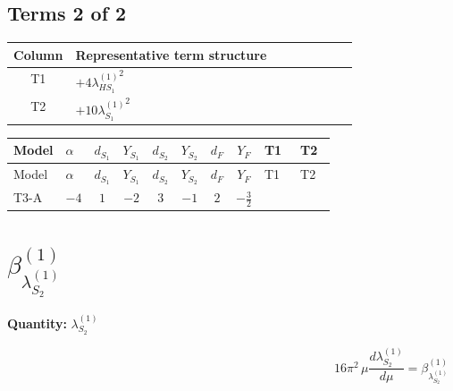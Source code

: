 \documentclass[8pt]{article}
\begin{document}
\begin{landscape}
\subsection*{Terms 2 of 2}
\begin{center}
\begin{tabular}{@{}c >{\raggedright\arraybackslash}p{0.82\linewidth}@{}}
\toprule
Column & Representative term structure \\
\midrule
T1 & \(\displaystyle +4 {\lambda_{HS_1}^{(1)}}^2\) \\
\midrule
T2 & \(\displaystyle +10 {\lambda_{S_1}^{(1)}}^2\) \\
\midrule
\bottomrule
\end{tabular}
\end{center}
\smallskip
\tiny
\begin{longtable}{@{}llcccccc >{\raggedright\arraybackslash}p{0.21\linewidth} >{\raggedright\arraybackslash}p{0.21\linewidth}@{}}
\toprule
Model & $\alpha$ & $d_{S_1}$ & $Y_{S_1}$ & $d_{S_2}$ & $Y_{S_2}$ & $d_F$ & $Y_F$ & T1 & T2 \\
\midrule
\endfirsthead
\toprule
Model & $\alpha$ & $d_{S_1}$ & $Y_{S_1}$ & $d_{S_2}$ & $Y_{S_2}$ & $d_F$ & $Y_F$ & T1 & T2 \\
\midrule
\endhead
T3-A & $-4$ & $1$ & $-2$ & $3$ & $-1$ & $2$ & $-\frac{3}{2}$ & \scriptsize\adjustbox{max width=\linewidth}{$\begin{gathered} +4 {\lambda_{HS_1}^{(1)}}^2\end{gathered}$} & \scriptsize\adjustbox{max width=\linewidth}{$\begin{gathered} +10 {\lambda_{S_1}^{(1)}}^2\end{gathered}$} \\
\midrule
\bottomrule
\end{longtable}
\clearpage
\section*{$\beta_{\lambda_{S_2}^{(1)}}^{(1)}$}
\noindent\textbf{Quantity: }$\lambda_{S_2}^{(1)}$\par\smallskip
\[16\pi^2\,\mu\frac{d \lambda_{S_2}^{(1)}}{d\mu}=\beta_{\lambda_{S_2}^{(1)}}^{(1)}\]

\end{landscape}
\end{document}

